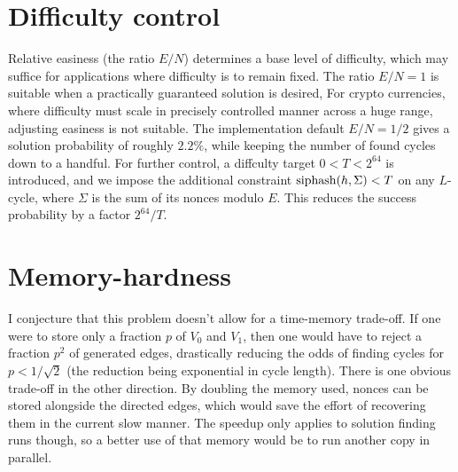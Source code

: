 \documentclass[11pt, oneside]{article}
\newcommand{\hash}{{\rm siphash}}
\begin{document}
\begin{center}
\end{center}

\section{Difficulty control}
Relative easiness (the ratio $E/N$) determines a base level of difficulty,
which may suffice for applications where difficulty is to remain fixed.
The ratio $E/N=1$ is suitable when a practically guaranteed solution is desired,
For crypto currencies, where difficulty must scale in precisely
controlled manner across a huge range, adjusting easiness is not suitable.
The implementation default $E/N=1/2$ gives a solution probability of roughly $2.2\%$,
while keeping the number of found cycles down to a handful.
For further control, a diffculty target $0 < T < 2^{64}$ is introduced,
and we impose the additional constraint $\hash(h,\Sigma) < T$
on any $L$-cycle, where $\Sigma$ is the sum of its nonces modulo $E$.
This reduces the success probability by a factor $2^{64}/T$.

\section{Memory-hardness}
I conjecture that this problem doesn't allow for a time-memory trade-off. If
one were to store only a fraction $p$ of $V_0$ and $V_1$, then one would have
to reject a fraction $p^2$ of generated edges, drastically reducing the odds of
finding cycles for $p<1/\sqrt{2}$ (the reduction being exponential in cycle length).
There is one obvious trade-off in the other direction. By doubling the memory
used, nonces can be stored alongside the directed edges, which would save the
effort of recovering them in the current slow manner. The speedup only
applies to solution finding runs though, so a better use of that memory would be to run
another copy in parallel.
\end{document}
